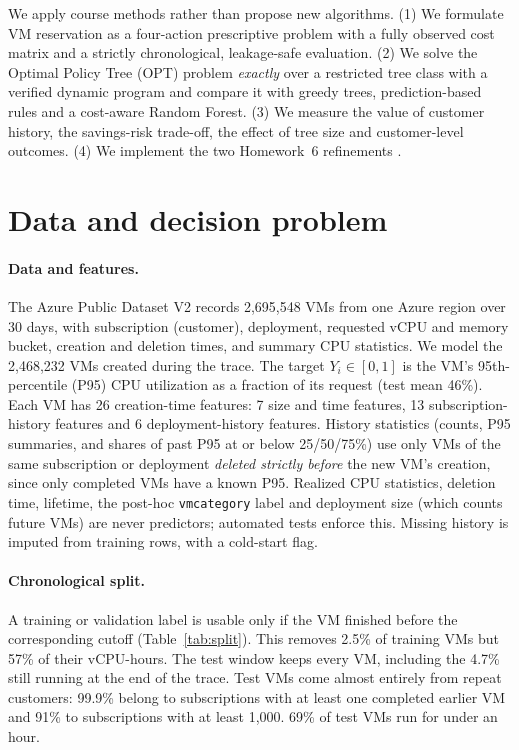 \documentclass[10pt]{article}
\begin{document}
We apply course methods rather than propose new algorithms. (1) We formulate VM reservation as a four-action prescriptive problem with a fully observed cost matrix and a strictly chronological, leakage-safe evaluation. (2) We solve the Optimal Policy Tree (OPT) problem \citep{amram2022opt} \emph{exactly} over a restricted tree class with a verified dynamic program and compare it with greedy trees, prediction-based rules and a cost-aware Random Forest. (3) We measure the value of customer history, the savings-risk trade-off, the effect of tree size and customer-level outcomes. (4) We implement the two Homework~6 refinements \citep{bertsimas2019mlopt}.

\section{Data and decision problem}
\label{sec:data}

\paragraph{Data and features.} The Azure Public Dataset V2 \citep{azuredataset} records 2,695,548 VMs from one Azure region over 30 days, with subscription (customer), deployment, requested vCPU and memory bucket, creation and deletion times, and summary CPU statistics. We model the 2,468,232 VMs created during the trace. The target $Y_i\in[0,1]$ is the VM's 95th-percentile (P95) CPU utilization as a fraction of its request (test mean 46\%). Each VM has 26 creation-time features: 7 size and time features, 13 subscription-history features and 6 deployment-history features. History statistics (counts, P95 summaries, and shares of past P95 at or below 25/50/75\%) use only VMs of the same subscription or deployment \emph{deleted strictly before} the new VM's creation, since only completed VMs have a known P95. Realized CPU statistics, deletion time, lifetime, the post-hoc \texttt{vmcategory} label and deployment size (which counts future VMs) are never predictors; automated tests enforce this. Missing history is imputed from training rows, with a cold-start flag.

\paragraph{Chronological split.} A training or validation label is usable only if the VM finished before the corresponding cutoff (Table~\ref{tab:split}). This removes 2.5\% of training VMs but 57\% of their vCPU-hours. The test window keeps every VM, including the 4.7\% still running at the end of the trace. Test VMs come almost entirely from repeat customers: 99.9\% belong to subscriptions with at least one completed earlier VM and 91\% to subscriptions with at least 1,000. 69\% of test VMs run for under an hour.
\end{document}
